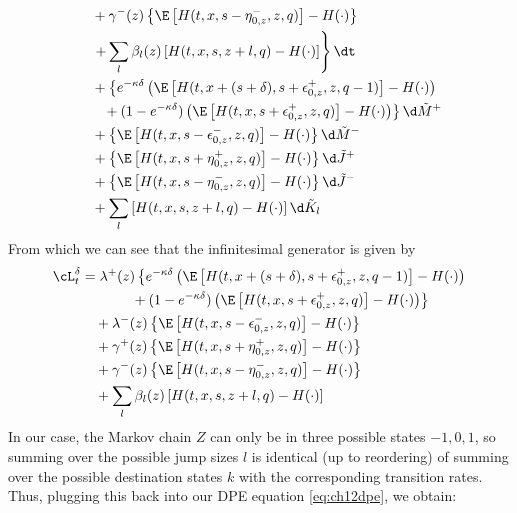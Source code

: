 \documentclass[12pt]{article}
\begin{document}
\begin{align*}
& \quad + \gamma^-(z) \left\lbrace \E \left[ H(t,x, s-\eta^-_{0,z},z,q) \right] - H(\cdot) \right\rbrace \\
& \left. \quad + \sum_l \beta_l(z) \left[ H(t,x,s,z+l,q) - H(\cdot) \right] \right\rbrace \dt \\
& \quad + \left\lbrace  e^{ -\kappa \delta } \left( \E \left[ H(t,x + (s + \delta), s + \epsilon^+_{0,z}, z, q-1) \right] - H(\cdot) \right) \right. \\
& \left. \phantom{ + \left\lbrace \right.} + (1 - e^{-\kappa \delta}) \left( \E \left[ H(t, x, s+\epsilon^+_{0,z},z,q) \right] - H(\cdot) \right) \right\rbrace \d \tilde{M}^+ \\
& \quad + \left\lbrace \E \left[ H(t,x, s-\epsilon^-_{0,z},z,q) \right] - H(\cdot) \right\rbrace \d \tilde{M}^- \\
& \quad + \left\lbrace \E \left[ H(t,x, s+\eta^+_{0,z},z,q) \right] - H(\cdot) \right\rbrace \d \tilde{J}^+ \\
& \quad + \left\lbrace \E \left[ H(t,x, s-\eta^-_{0,z},z,q) \right] - H(\cdot) \right\rbrace \d \tilde{J}^- \\
& \quad + \sum_l\left[ H(t,x,s,z+l,q) - H(\cdot) \right] \d \tilde{K}_l \\
\end{align*}
From which we can see that the infinitesimal generator is given by
\begin{equation}
\begin{split}
\cL^{\delta}_t & = \lambda^+(z) \left\lbrace  e^{ -\kappa \delta } \left( \E \left[ H(t,x + (s + \delta), s + \epsilon^+_{0,z}, z, q-1) \right] - H(\cdot) \right) \right. \\
& \left. \phantom{\lambda^+(z) \left\lbrace \right.} + (1 - e^{-\kappa \delta}) \left( \E \left[ H(t, x, s+\epsilon^+_{0,z},z,q) \right] - H(\cdot) \right) \right\rbrace \\
& \quad + \lambda^-(z) \left\lbrace \E \left[ H(t,x, s-\epsilon^-_{0,z},z,q) \right] - H(\cdot) \right\rbrace \\
& \quad + \gamma^+(z) \left\lbrace \E \left[ H(t,x, s+\eta^+_{0,z},z,q) \right] - H(\cdot) \right\rbrace \\
& \quad + \gamma^-(z) \left\lbrace \E \left[ H(t,x, s-\eta^-_{0,z},z,q) \right] - H(\cdot) \right\rbrace \\
& \quad + \sum_l \beta_l(z) \left[ H(t,x,s,z+l,q) - H(\cdot) \right]
\end{split}
\end{equation}
In our case, the Markov chain $Z$ can only be in three possible states $-1, 0, 1$, so summing over the possible jump sizes $l$ is identical (up to reordering) of summing over the possible destination states $k$ with the corresponding transition rates. Thus, plugging this back into our DPE equation \ref{eq:ch12dpe}, we obtain:
\end{document}
